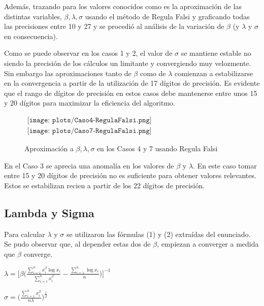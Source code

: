 Adem\'as, trazando para los valores conocidos como es la aproximaci\'on de las 
distintas variables, $\beta, \lambda, \sigma$ usando el m\'etodo de Regula Falsi
y graficando todas las precisiones entre 10 y 27 y se procedi\'o al an\'alisis de
la variaci\'on de $\beta$ (y $\lambda$ y $\sigma$ en consecuencia).

Como se puede observar en los casos 1 y 2, el valor de $\sigma$ se mantiene 
estable no siendo la precisi\'on de los c\'alculos un limitante y convergiendo 
muy velozmente. Sin embargo las aproximaciones tanto de $\beta$ como de $\lambda$ 
comienzan a estabilizarse en la convergencia a partir de la utilizaci\'on de 17 
d\'igitos de precisi\'on. Es evidente que el rango de d\'igitos de precisi\'on en 
estos casos debe mantenerse entre unos 15 y 20 d\'igitos para maximizar la 
eficiencia del algoritmo.  

\begin{figure} [H]
$\begin{array}{c}
\texttt{[image: plots/Caso4-RegulaFalsi.png]} \\
\texttt{[image: plots/Caso7-RegulaFalsi.png]}
\end{array}$

\caption{Aproximaci\'on a $\beta, \lambda, \sigma$ en los Casos 4 y 7 usando 
Regula Falsi}
\end{figure}

En el Caso 3 se aprecia una anomal\'ia en los valores de $\beta$ y $\lambda$.
En este caso tomar entre 15 y 20 d\'igitos de precisi\'on no es suficiente para 
obtener valores relevantes. Estos se estabilizan recien a partir de los 22 
d\'igitos de precisi\'on.

\subsection{Lambda y Sigma}

\indent Para calcular $\lambda$ y $\sigma$ se utilizaron las f\'ormulas 
(1) y (2) extra\'idas del enunciado. Se pudo observar que, al depender estas 
dos de $\beta$, empiezan a converger a medida que $\beta$ converge.
\begin{center}
$\lambda = \big[ \beta \big( \frac{\sum_{i=1}^{n}x_i^\beta \log x_i}{ \sum_{i=1}^{n} x_i^\beta} 
- \frac{\sum_{i=1}^{n} \log x_i}{n} \big)\big]^{-1}$

$\sigma = \big( \frac{\sum_{i=1}^{n} x_i^\beta}{n\lambda}\big)^{\frac{1}{\beta}}$
\end{center}

